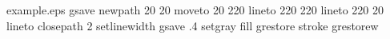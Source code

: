 %
%
%
%
%
\begin{filecontents*}{example.eps}
gsave
newpath
  20 20 moveto
  20 220 lineto
  220 220 lineto
  220 20 lineto
closepath
2 setlinewidth
gsave
  .4 setgray fill
grestore
stroke
grestorew
\end{filecontents*}
%
\RequirePackage{fix-cm}
%
\documentclass[smallextended]{svjour3}       %
%
\smartqed  %
%
\usepackage{graphicx}
\usepackage{xcolor}
\usepackage{listings}
\usepackage{hyperref}
\usepackage[final]{changes}


\usepackage{rotating}
\usepackage{pdflscape}



%
%
%
%




